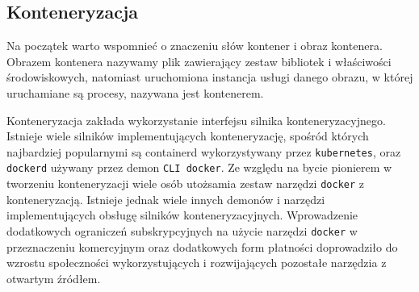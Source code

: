 \documentclass[12pt,twoside]{article}
\begin{document}
\subsection{Konteneryzacja}

Na początek warto wspomnieć o znaczeniu słów kontener i obraz kontenera. Obrazem kontenera nazywamy plik zawierający zestaw bibliotek i właściwości środowiskowych, natomiast uruchomiona instancja usługi danego obrazu, w której uruchamiane są procesy, nazywana jest kontenerem.

Konteneryzacja zakłada wykorzystanie interfejsu silnika konteneryzacyjnego. Istnieje wiele silników implementujących konteneryzację, spośród których najbardziej popularnymi są containerd wykorzystywany przez \texttt{kubernetes}, oraz \texttt{dockerd} używany przez demon \texttt{CLI docker}. Ze względu na bycie pionierem w tworzeniu konteneryzacji wiele osób utożsamia zestaw narzędzi \texttt{docker} z konteneryzacją. Istnieje jednak wiele innych demonów i narzędzi implementujących obsługę silników konteneryzacyjnych. Wprowadzenie dodatkowych ograniczeń subskrypcyjnych na użycie narzędzi \texttt{docker} w przeznaczeniu komercyjnym oraz dodatkowych form płatności\cite{sub} doprowadziło do wzrostu społeczności wykorzystujących i rozwijających pozostałe narzędzia z otwartym źródłem.
\end{document}
